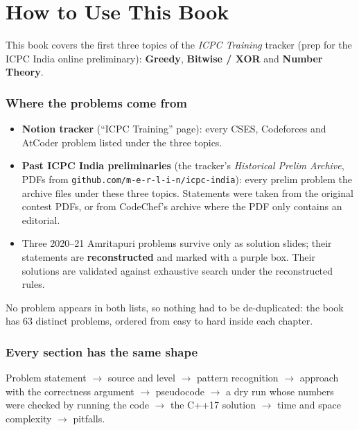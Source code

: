 \chapter*{How to Use This Book}

This book covers the first three topics of the \emph{ICPC Training} tracker
(prep for the ICPC India online preliminary): \textbf{Greedy},
\textbf{Bitwise / XOR} and \textbf{Number Theory}.

\subsection*{Where the problems come from}
\begin{itemize}
  \item \textbf{Notion tracker} (``ICPC Training'' page): every CSES,
        Codeforces and AtCoder problem listed under the three topics.
  \item \textbf{Past ICPC India preliminaries} (the tracker's
        \emph{Historical Prelim Archive}, PDFs from
        \texttt{github.com/m-e-r-l-i-n/icpc-india}): every prelim problem the
        archive files under these three topics. Statements were taken from the
        original contest PDFs, or from CodeChef's archive where the PDF only
        contains an editorial.
  \item Three 2020--21 Amritapuri problems survive only as solution slides;
        their statements are \textbf{reconstructed} and marked with a purple
        box. Their solutions are validated against exhaustive search under the
        reconstructed rules.
\end{itemize}
No problem appears in both lists, so nothing had to be de-duplicated: the
book has 63 distinct problems, ordered from easy to hard inside each
chapter.

\subsection*{Every section has the same shape}
Problem statement $\to$ source and level $\to$ pattern recognition $\to$
approach with the correctness argument $\to$ pseudocode $\to$ a dry run whose
numbers were checked by running the code $\to$ the C++17 solution $\to$ time
and space complexity $\to$ pitfalls.

